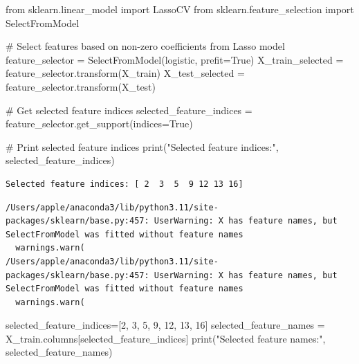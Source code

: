 \documentclass[
  11pt,
  letterpaper,
  DIV=11,
  numbers=noendperiod]{scrartcl}
\newenvironment{Shaded}{\begin{snugshade}}{\end{snugshade}}
\newcommand{\BuiltInTok}[1]{\textcolor[rgb]{0.00,0.23,0.31}{#1}}
\newcommand{\CommentTok}[1]{\textcolor[rgb]{0.37,0.37,0.37}{#1}}
\newcommand{\DecValTok}[1]{\textcolor[rgb]{0.68,0.00,0.00}{#1}}
\newcommand{\ImportTok}[1]{\textcolor[rgb]{0.00,0.46,0.62}{#1}}
\newcommand{\NormalTok}[1]{\textcolor[rgb]{0.00,0.23,0.31}{#1}}
\newcommand{\OperatorTok}[1]{\textcolor[rgb]{0.37,0.37,0.37}{#1}}
\newcommand{\StringTok}[1]{\textcolor[rgb]{0.13,0.47,0.30}{#1}}
\newcommand{\VariableTok}[1]{\textcolor[rgb]{0.07,0.07,0.07}{#1}}
\begin{document}
\begin{Shaded}
\begin{Highlighting}[]
\ImportTok{from}\NormalTok{ sklearn.linear\_model }\ImportTok{import}\NormalTok{ LassoCV}
\ImportTok{from}\NormalTok{ sklearn.feature\_selection }\ImportTok{import}\NormalTok{ SelectFromModel}



\CommentTok{\# Select features based on non{-}zero coefficients from Lasso model}
\NormalTok{feature\_selector }\OperatorTok{=}\NormalTok{ SelectFromModel(logistic, prefit}\OperatorTok{=}\VariableTok{True}\NormalTok{)}
\NormalTok{X\_train\_selected }\OperatorTok{=}\NormalTok{ feature\_selector.transform(X\_train)}
\NormalTok{X\_test\_selected }\OperatorTok{=}\NormalTok{ feature\_selector.transform(X\_test)}

\CommentTok{\# Get selected feature indices}
\NormalTok{selected\_feature\_indices }\OperatorTok{=}\NormalTok{ feature\_selector.get\_support(indices}\OperatorTok{=}\VariableTok{True}\NormalTok{)}

\CommentTok{\# Print selected feature indices}
\BuiltInTok{print}\NormalTok{(}\StringTok{"Selected feature indices:"}\NormalTok{, selected\_feature\_indices)}
\end{Highlighting}
\end{Shaded}

\begin{verbatim}
Selected feature indices: [ 2  3  5  9 12 13 16]
\end{verbatim}

\begin{verbatim}
/Users/apple/anaconda3/lib/python3.11/site-packages/sklearn/base.py:457: UserWarning: X has feature names, but SelectFromModel was fitted without feature names
  warnings.warn(
/Users/apple/anaconda3/lib/python3.11/site-packages/sklearn/base.py:457: UserWarning: X has feature names, but SelectFromModel was fitted without feature names
  warnings.warn(
\end{verbatim}

\begin{Shaded}
\begin{Highlighting}[]
\NormalTok{selected\_feature\_indices}\OperatorTok{=}\NormalTok{[}\DecValTok{2}\NormalTok{, }\DecValTok{3}\NormalTok{, }\DecValTok{5}\NormalTok{, }\DecValTok{9}\NormalTok{, }\DecValTok{12}\NormalTok{, }\DecValTok{13}\NormalTok{, }\DecValTok{16}\NormalTok{]}
\NormalTok{selected\_feature\_names }\OperatorTok{=}\NormalTok{ X\_train.columns[selected\_feature\_indices]}
\BuiltInTok{print}\NormalTok{(}\StringTok{"Selected feature names:"}\NormalTok{, selected\_feature\_names)}
\end{Highlighting}
\end{Shaded}
\end{document}
